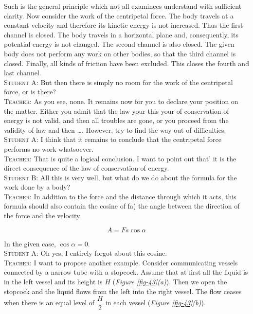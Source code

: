 \documentclass[a4paper,sfsidenotes]{tufte-book}
\begin{document}
Such is the general principle which not all examinees understand with sufficient clarity. Now consider the work of the centripetal force. The body travels at a constant velocity and therefore its kinetic energy
is not increased. Thus the first channel is closed. The body travels in a horizontal plane and, consequently, its potential energy is not changed. The second channel is also closed. The given body does not perform any work on other bodies, so that the third channel is closed. Finally, all kinds of friction have been excluded. This closes the fourth and last channel.
\\
\textsc{Student A:} But then there is simply no room for the work of the centripetal force, or is there?
\\
\textsc{Teacher:} As you see, none. It remains now for you to declare your position on the matter. Either you admit that the law your this your of conservation of energy is not valid, and then all troubles are gone, or you proceed from the validity of law and then \ldots{}. However, try to find the way out of
difficulties.
\\
\textsc{Student A:} I think that it remains to conclude that the centripetal force performs no work whatsoever.
\\
\textsc{Teacher:} That is quite a logical conclusion. I want to point out that' it is the direct consequence of the law of conservation of energy.
\\
\textsc{Student B:} All this is very well, but what do we do about the formula for the work done by a body?
\\
\textsc{Teacher:} In addition to the force and the distance through which it acts, this formula should also contain the cosine of fa) the angle between the direction of the force and the velocity

\begin{equation*}
A = F s \cos \alpha
\end{equation*}

In the given case, $\cos \alpha = 0$.
\\
\textsc{Student A:} Oh yes, I entirely forgot about this cosine.
\\
\textsc{Teacher:} I want to propose another example. Consider communicating vessels connected by a narrow tube with a stopcock. Assume that at first all the liquid is in the left vessel and its height is $H$ (\emph{Figure \ref{fig-43}(a)}). Then we open the stopcock and the liquid flows from the left into the right vessel. The flow ceases when there is an equal level of $\dfrac{H}{2}$ in each vessel (\emph{Figure \ref{fig-43}(b)}).
\end{document}
